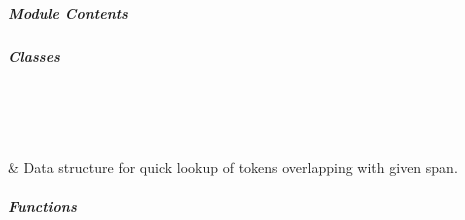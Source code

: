 \documentclass[letterpaper,10pt,english]{sphinxmanual}
\begin{document}
\subparagraph{}
\label{\detokenize{autoapi/pine/backend/pineiaa/bratiaa/utils/index:module-pine.backend.pineiaa.bratiaa.utils}}\label{\detokenize{autoapi/pine/backend/pineiaa/bratiaa/utils/index:pine-backend-pineiaa-bratiaa-utils}}\label{\detokenize{autoapi/pine/backend/pineiaa/bratiaa/utils/index::doc}}

\subparagraph{Module Contents}
\label{\detokenize{autoapi/pine/backend/pineiaa/bratiaa/utils/index:module-contents}}

\subparagraph{Classes}
\label{\detokenize{autoapi/pine/backend/pineiaa/bratiaa/utils/index:classes}}

\begin{savenotes}\sphinxatlongtablestart\begin{longtable}[c]{}
\hline

\endfirsthead

%
{}\\
\hline

\endhead

\hline
{}\\
\endfoot

\endlastfoot

\sphinxAtStartPar
{\hyperref[\detokenize{autoapi/pine/backend/pineiaa/bratiaa/utils/index:pine.backend.pineiaa.bratiaa.utils.TokenOverlap}]{}}
&
\sphinxAtStartPar
Data structure for quick lookup of tokens overlapping with given span.
\\
\hline
\end{longtable}\sphinxatlongtableend\end{savenotes}


\subparagraph{Functions}
\label{\detokenize{autoapi/pine/backend/pineiaa/bratiaa/utils/index:functions}}
\end{document}
